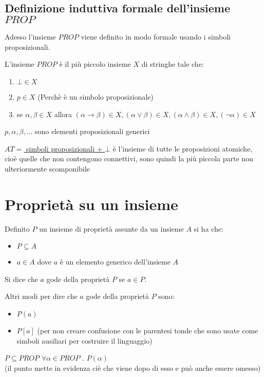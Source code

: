 \documentclass{article}
\theoremstyle{break}
\theoremstyle{break}
\theoremstyle{break}
\theoremstyle{break}
\begin{document}
\subsection{Definizione induttiva formale dell'insieme \( PROP \)}
Adesso l'insieme \( PROP \) viene definito in modo formale usando i simboli proposizionali.
\begin{definition}
	L'insieme \( PROP \) è il più piccolo insieme \( X \) di stringhe tale che:
	\begin{enumerate}
		\item \( \bot \in X \)
		\item \( p \in X \) (Perchè è un simbolo proposizionale)
		\item se \( \alpha, \beta \in X \) allora \( (\alpha \to \beta ) \in X, (\alpha \vee \beta ) \in X,
		      (\alpha \wedge \beta ) \in X, (\neg \alpha ) \in X \)
	\end{enumerate}
	\( p, \alpha , \beta, \ldots  \) sono elementi proposizionali generici
\end{definition}
\underline{\( AT  = \) simboli proposizionali + \( \bot \)}
è l'insieme di tutte le proposizioni atomiche,
cioè quelle che non contengono connettivi, sono quindi la più piccola parte
non ulteriormente scomponibile

\section{Proprietà su un insieme}
Definito \( P \) un insieme di proprietà assunte da un insieme \( A \) si ha che:
\begin{itemize}
	\item \( P \subseteq A \)
	\item \( a \in A \) dove \( a \) è un elemento generico dell'insieme \( A \)
\end{itemize}
Si dice che \( a \) gode della proprietà \( P \) se \( a \in P \).

Altri modi per dire che \( a \) gode della proprietà \( P \) sono:
\begin{itemize}
	\item \( P(a) \)
	\item \( P[a] \) (per non creare confusione con le parentesi tonde che sono
	      usate come simboli ausiliari per costruire il linguaggio)
\end{itemize}

\( P \subseteq PROP \)\hspace{5mm} \( \forall \alpha \in PROP \) \( . \) \( P(\alpha ) \)\\
(il punto mette in evidenza ciè che viene dopo di esso e può anche essere omesso)
\end{document}
